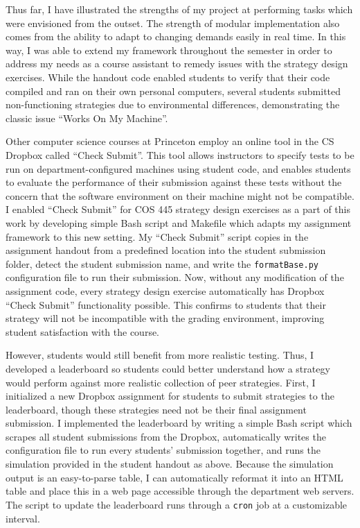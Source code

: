 \documentclass[pageno]{jpaper}
\begin{document}
Thus far, I have illustrated the strengths of my project at performing tasks which were envisioned from the outset.
The strength of modular implementation also comes from the ability to adapt to changing demands easily in real time.
In this way, I was able to extend my framework throughout the semester in order to address my needs as a course assistant to remedy issues with the strategy design exercises.
While the handout code enabled students to verify that their code compiled and ran on their own personal computers, several students submitted non-functioning strategies due to environmental differences, demonstrating the classic issue ``Works On My Machine''.

Other computer science courses at Princeton employ an online tool in the CS Dropbox called ``Check Submit''.
This tool allows instructors to specify tests to be run on department-configured machines using student code, and enables students to evaluate the performance of their submission against these tests without the concern that the software environment on their machine might not be compatible.
I enabled ``Check Submit'' for COS 445 strategy design exercises as a part of this work by developing simple Bash script and Makefile which adapts my assignment framework to this new setting.
My ``Check Submit'' script copies in the assignment handout from a predefined location into the student submission folder, detect the student submission name, and write the \texttt{formatBase.py} configuration file to run their submission.
Now, without any modification of the assignment code, every strategy design exercise automatically has Dropbox ``Check Submit'' functionality possible.
This confirms to students that their strategy will not be incompatible with the grading environment, improving student satisfaction with the course.

However, students would still benefit from more realistic testing.
Thus, I developed a leaderboard so students could better understand how a strategy would perform against more realistic collection of peer strategies.
First, I initialized a new Dropbox assignment for students to submit strategies to the leaderboard, though these strategies need not be their final assignment submission.
I implemented the leaderboard by writing a simple Bash script which scrapes all student submissions from the Dropbox, automatically writes the configuration file to run every students' submission together, and runs the simulation provided in the student handout as above.
Because the simulation output is an easy-to-parse table, I can automatically reformat it into an HTML table and place this in a web page accessible through the department web servers.
The script to update the leaderboard runs through a \texttt{cron} job at a customizable interval.
\end{document}
